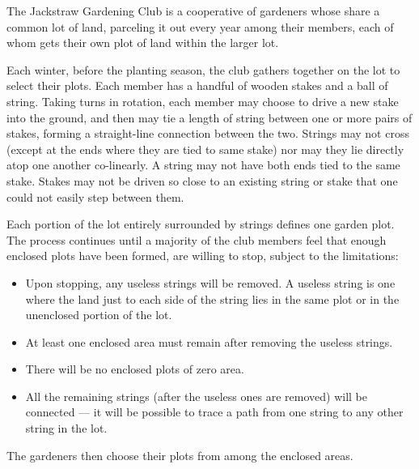 
The Jackstraw Gardening Club is a cooperative of gardeners whose share
a common lot of land, parceling it out every year among their members,
each of whom gets their own plot of land within the larger lot.


Each winter, before the planting season, the club gathers together on
the lot to select their plots. Each member has a handful of wooden
stakes and a ball of string. Taking turns in rotation, each member may
choose to drive a new stake into the ground, and then may tie a length
of string between one or more pairs of stakes, forming a straight-line
connection between the two. Strings may not cross (except at the ends
where they are tied to same stake) nor may they lie directly atop one
another co-linearly. A string may not have both ends tied to the same
stake. Stakes may not be driven so close to an existing
string or stake that one could not easily step between them.

Each portion of the lot entirely surrounded by strings defines one
garden plot. The process continues until a majority of the club
members feel that enough enclosed plots have been formed, are willing
to stop, subject to the limitations:

\begin{itemize}

\item Upon stopping, any useless strings will be removed. A 
  useless string is one where the land just to each side of the string
  lies in the same plot or in the unenclosed portion of the lot.

\item At least one enclosed area must remain after removing the useless
  strings.

\item There will be no enclosed plots of zero area.

\item All the remaining strings (after the useless ones are removed)
  will be connected --- it will be possible to trace a path from one
  string to any other string in the lot.
\end{itemize}

The gardeners then choose their plots from among the enclosed areas.

